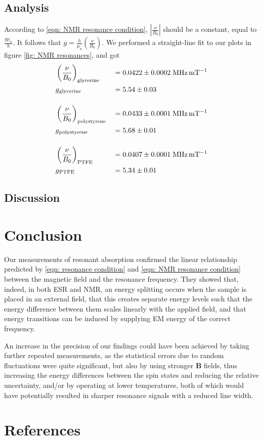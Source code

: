 \documentclass[a4paper]{jpconf}
\numberwithin{equation}{section}
\begin{document}
\subsection{Analysis}
According to \eqref{eqn: NMR resonance condition}, $\left| \frac{\nu}{B_0} \right|$ should be a constant, equal to $\frac{g \mu_n}{h}$. It follows that $g = \frac{h}{\mu_n} \left( \frac{\nu}{B_0} \right)$. We performed a straight-line fit to our plots in figure \ref{fig: NMR resonances}, and got
\begin{alignat*}{2}
    &\left( \frac{\nu}{B_0} \right)_{\text{glycerine}} &&= 0.0422 \pm 0.0002 \; \si{\mega\hertz\per\milli\tesla} \\
	&g\textsubscript{glycerine} &&= 5.54 \pm 0.03 \\[12pt]
	&\left( \frac{\nu}{B_0} \right)_{\text{polystyrene}} &&= 0.0433 \pm 0.0001 \; \si{\mega\hertz\per\milli\tesla} \\
	&g\textsubscript{polystyrene} &&= 5.68 \pm 0.01 \\[12pt]
	&\left( \frac{\nu}{B_0} \right)_{\text{PTFE}} &&= 0.0407 \pm 0.0001 \; \si{\mega\hertz\per\milli\tesla} \\
	&g\textsubscript{PTFE} &&= 5.34 \pm 0.01 \\
\end{alignat*}

\subsection{Discussion}

\section{Conclusion}
Our measurements of resonant absorption confirmed the linear relationship predicted by \eqref{eqn: resonance condition} and \eqref{eqn: NMR resonance condition} between the magnetic field and the resonance frequency. They showed that, indeed, in both ESR and NMR, an energy splitting occurs when the sample is placed in an external field, that this creates separate energy levels such that the energy difference between them scales linearly with the applied field, and that energy transitions can be induced by supplying EM energy of the correct frequency. 

An increase in the precision of our findings could have been achieved by taking further repeated measurements, as the statistical errors due to random fluctuations were quite significant, but also by using stronger $\mathbf{B}$ fields, thus increasing the energy differences between the spin states and reducing the relative uncertainty, and/or by operating at lower temperatures, both of which would have potentially resulted in sharper resonance signals with a reduced line width.

\section*{References}
\begin{thebibliography}{9}
\end{thebibliography}
\end{document}
